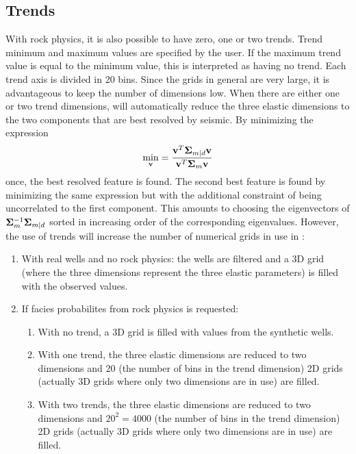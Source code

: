 \subsection{Trends}
With rock physics, it is also possible to have zero, one or two trends. Trend minimum and maximum values are specified by the user. If the maximum trend value is equal to the minimum value, this is interpreted as having no trend. Each trend axis is divided in 20 bins. Since the grids in general are very large, it is advantageous to keep the number of dimensions low. When there are either one or two trend dimensions, \crava will automatically reduce the three elastic dimensions to the two components that are best resolved by seismic. By minimizing the expression 
\label{eq:geneig}
\begin{equation}
\min_{\mathbf{v}} = \frac{\mathbf{v}^T \mathbf{\Sigma}_{m|d}\mathbf{v}}{\mathbf{v}^T \mathbf{\Sigma}_{m}\mathbf{v}}
\end{equation}
once, the best resolved feature is found. The second best feature is found by minimizing the same expression but with the additional constraint of being uncorrelated to the first component. This amounts to choosing the eigenvectors of $\mathbf{\Sigma}_{m}^{-1}\mathbf{\Sigma}_{m|d}$ sorted in increasing order of the corresponding eigenvalues. However, the use of trends will increase the number of numerical grids in use in \crava :
\begin{enumerate}
\item With real wells and no rock physics: the wells are filtered and a 3D grid (where the three dimensions represent the three elastic parameters) is filled with the observed values.
\item If facies probabilites from rock physics is requested:
\begin{enumerate}
\item With no trend, a 3D grid is filled with values from the synthetic wells. 
\item With one trend, the three elastic dimensions are reduced to two dimensions and 20 (the number of bins in the trend dimension) 2D grids (actually 3D grids where only two dimensions are in use) are filled.
\item With two trends, the three elastic dimensions are reduced to two dimensions and $20^2=4000$ (the number of bins in the trend dimension) 2D grids (actually 3D grids where only two dimensions are in use) are filled.
\end{enumerate}
\end{enumerate}

